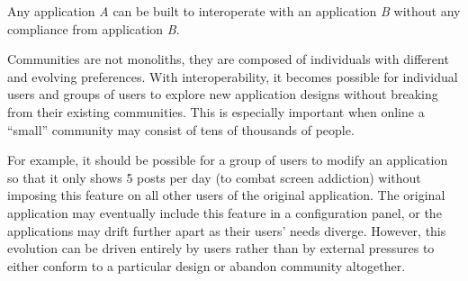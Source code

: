 





\begin{requirement}
\label{requirements:adversarial-interop}
Any application \emph{A} can be built to interoperate with an application \emph{B} without any compliance from application \emph{B}.
\end{requirement}

Communities are not monoliths, they are composed of individuals
with different and evolving preferences.
With interoperability, it becomes possible for individual users and groups of users to explore new application designs
without breaking from their existing communities.
This is especially important when online a ``small''
community may consist of tens of thousands of people.

For example, it should be possible for a group of users to
modify an application so that it only shows 5 posts per day (to combat screen addiction)
without imposing this feature on all other users of the original application.
The original application may eventually include this feature in a configuration panel,
or the applications may drift further apart as their users' needs diverge. However, this
evolution can be driven entirely by users rather than by external pressures
to either conform to a particular design or abandon community altogether.


